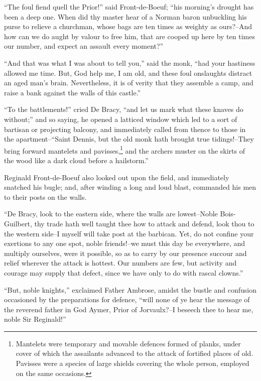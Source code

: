 ``The foul fiend quell the Prior!'' said Front-de-Boeuf; ``his morning's
drought has been a deep one. When did thy master hear of a Norman baron
unbuckling his purse to relieve a churchman, whose bags are ten times as
weighty as ours?--And how can we do aught by valour to free him, that
are cooped up here by ten times our number, and expect an assault every
moment?''

``And that was what I was about to tell you,'' said the monk, ``had your
hastiness allowed me time. But, God help me, I am old, and these foul
onslaughts distract an aged man's brain. Nevertheless, it is of verity
that they assemble a camp, and raise a bank against the walls of this
castle.''

``To the battlements!'' cried De Bracy, ``and let us mark what these
knaves do without;'' and so saying, he opened a latticed window which
led to a sort of bartisan or projecting balcony, and immediately called
from thence to those in the apartment--``Saint Dennis, but the old monk
hath brought true tidings!--They bring forward mantelets and
pavisses,\footnote{Mantelets were temporary and movable defences formed of
planks, under cover of which the assailants advanced to the attack of
fortified places of old. Pavisses were a species of large shields
covering the whole person, employed on the same occasions.}
and the archers muster on the skirts of the wood like a dark
cloud before a hailstorm.''

Reginald Front-de-Boeuf also looked out upon the field, and immediately
snatched his bugle; and, after winding a long and loud blast, commanded
his men to their posts on the walls.

``De Bracy, look to the eastern side, where the walls are lowest--Noble
Bois-Guilbert, thy trade hath well taught thee how to attack and defend,
look thou to the western side--I myself will take post at the barbican.
Yet, do not confine your exertions to any one spot, noble friends!--we
must this day be everywhere, and multiply ourselves, were it possible,
so as to carry by our presence succour and relief wherever the attack is
hottest. Our numbers are few, but activity and courage may supply that
defect, since we have only to do with rascal clowns.''

``But, noble knights,'' exclaimed Father Ambrose, amidst the bustle and
confusion occasioned by the preparations for defence, ``will none of ye
hear the message of the reverend father in God Aymer, Prior of
Jorvaulx?--I beseech thee to hear me, noble Sir Reginald!''

